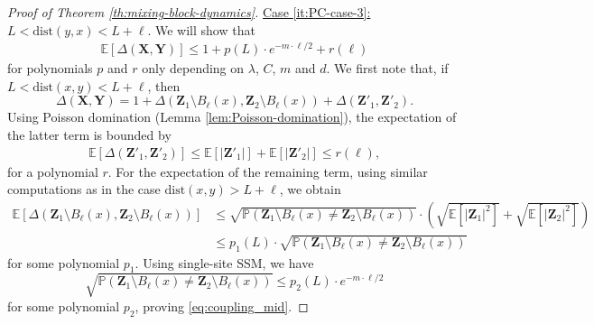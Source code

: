 \documentclass[10pt]{amsart}
\theoremstyle{definition}
\theoremstyle{remark}
\newcommand{\bX}{\mathbf{X}}
\newcommand{\bY}{\mathbf{Y}}
\newcommand{\bZ}{\mathbf{Z}}
\newcommand{\dist}{\mathrm{dist}}
\renewcommand{\P}{\mathbb{P}}
\newcommand{\E}{\mathbb{E}}
\newcommand{\activity}{\lambda}
\newcommand{\size}[1]{\left\lvert#1\right\rvert}
\begin{document}
\begin{proof}[Proof of Theorem \ref{th:mixing-block-dynamics}]
		\noindent \underline{Case \ref{it:PC-case-3}: $L < \dist(y,x) < L + \ell$}. 
		We will show that
		\begin{align}
			\E[\Delta(\bX, \bY)] \le 1 + p(L) \cdot e^{-m \cdot \ell/2} + r(\ell) \label{eq:coupling_mid}
		\end{align}
		for polynomials $p$ and $r$ only depending on $\activity$, $C$, $m$ and $d$.
		We first note that, if $L < \dist(x, y) < L + \ell$, then 
		\[
		\Delta(\bX, \bY) = 1 + \Delta(\bZ_1 \setminus B_{\ell}(x), \bZ_2 \setminus B_{\ell}(x)) + \Delta(\bZ'_1, \bZ'_2) .
		\]
		Using Poisson domination (Lemma \ref{lem:Poisson-domination}), the expectation of the latter term is bounded by
		\begin{align*}
			\E[\Delta(\bZ'_1, \bZ'_2)]
			\le \E[\size{\bZ'_1} ] + \E[\size{\bZ'_2} ]
			\le r(\ell) , 
		\end{align*}
		for a polynomial $r$.
		For the expectation of the remaining term, using similar computations as in the case $\dist(x, y) > L + \ell$, we obtain
		\begin{align*}
			\E[\Delta(\bZ_1 \setminus B_{\ell}(x), \bZ_2 \setminus B_{\ell}(x))] 
			&\le \sqrt{\P(\bZ_1 \setminus B_{\ell}(x) \neq \bZ_2 \setminus B_{\ell}(x))} \cdot \left(\sqrt{\E[\size{\bZ_1}^2]} + \sqrt{\E[\size{\bZ_2}^2]} \right) \\
			&\le p_1(L) \cdot \sqrt{\P(\bZ_1 \setminus B_{\ell}(x) \neq \bZ_2 \setminus B_{\ell}(x))}
		\end{align*}
		for some polynomial $p_1$.
		Using single-site SSM, we have
		\[
		\sqrt{\P(\bZ_1 \setminus B_{\ell}(x) \neq \bZ_2 \setminus B_{\ell}(x))} \le  p_2(L) \cdot e^{-m \cdot \ell/2} 
		\]
		for some polynomial $p_2$, proving  \eqref{eq:coupling_mid}.
		

\end{proof}
\end{document}
